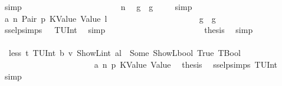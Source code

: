 \begin{isabellebody}
\ simp\isanewline
\ \ \ \ \ \ \ \ \ \ \ \ \ \ \ \ \ \ \ \ \isamarkupfalse%
\ \isamarkupfalse%
\ n\ \isamarkupfalse%
\ {\isachardoublequoteopen}g{\isacharprime}{\kern0pt}{\isacharprime}{\kern0pt}\ {\isasymle}\ g{\isachardoublequoteclose}\ \isamarkupfalse%
\ {}{\isacharparenleft}{\kern0pt}{}{\isacharparenright}{\kern0pt}\ \isamarkupfalse%
\ simp\isanewline
\ \ \ \ \ \ \ \ \ \ \ \ \ \ \ \ \ \ \ \ \isamarkupfalse%
\ \isamarkupfalse%
\ a{}\ n\ Pair\ p{}\ KValue\ Value\ l\isanewline
\ \ \ \ \ \ \ \ \ \ \ \ \ \ \ \ \ \ \ \ \isamarkupfalse%
\ {\isachardoublequoteopen}g{}{\isacharprime}{\kern0pt}\ {\isasymle}\ g{\isacharprime}{\kern0pt}{\isacharprime}{\kern0pt}{\isachardoublequoteclose}\ \isamarkupfalse%
\ ssel{\isachardot}{\kern0pt}psimps{\isacharparenleft}{\kern0pt}{}{\isacharparenright}{\kern0pt}\ {}{\isacharparenleft}{\kern0pt}{}{\isacharparenright}{\kern0pt}\ {}{\isacharparenleft}{\kern0pt}{}{\isacharparenright}{\kern0pt}\ TUInt\ \isamarkupfalse%
\ simp\isanewline
\ \ \ \ \ \ \ \ \ \ \ \ \ \ \ \ \ \ \ \ \isamarkupfalse%
\ \isamarkupfalse%
\ {\isacharquery}{\kern0pt}thesis\ \isamarkupfalse%
\ simp\isanewline
\ \ \ \ \ \ \ \ \ \ \ \ \ \ \ \ \ \ \isamarkupfalse%
\isanewline
\ \ \ \ \ \ \ \ \ \ \ \ \ \ \ \ \ \ \ \ \isamarkupfalse%
\ {\isachardoublequoteopen}{\isasymnot}\ less\ t{\isacharprime}{\kern0pt}\ {\isacharparenleft}{\kern0pt}TUInt\ b{}{}{}{\isacharparenright}{\kern0pt}\ v\ {\isacharparenleft}{\kern0pt}ShowL\isactrlsub i\isactrlsub n\isactrlsub t\ al{\isacharparenright}{\kern0pt}\ {\isacharequal}{\kern0pt}\ Some\ {\isacharparenleft}{\kern0pt}ShowL\isactrlsub b\isactrlsub o\isactrlsub o\isactrlsub l\ True{\isacharcomma}{\kern0pt}\ TBool{\isacharparenright}{\kern0pt}{\isachardoublequoteclose}\isanewline
\ \ \ \ \ \ \ \ \ \ \ \ \ \ \ \ \ \ \ \ \isamarkupfalse%
\ {}\ a{}\ n\ p{}\ KValue\ Value\ \isamarkupfalse%
\ {\isacharquery}{\kern0pt}thesis\ \isamarkupfalse%
\ ssel{\isachardot}{\kern0pt}psimps{\isacharparenleft}{\kern0pt}{}{\isacharparenright}{\kern0pt}\ TUInt\ \isamarkupfalse%
\ simp\isanewline
\ \ \ \ \ \ \ \ \ \ \ \ \ \ \ \ \ \ \isamarkupfalse%

\end{isabellebody}
